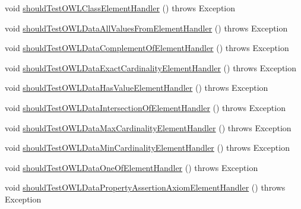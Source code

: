 \begin{DoxyCompactItemize}
\item 
void \hyperlink{classorg_1_1semanticweb_1_1owlapi_1_1contract_1_1_contract_owlxmlparser_test_a4edf0bd026bf1063202beddd96832b80}{should\-Test\-O\-W\-L\-Class\-Element\-Handler} ()  throws Exception 
\item 
void \hyperlink{classorg_1_1semanticweb_1_1owlapi_1_1contract_1_1_contract_owlxmlparser_test_a5c70c46244c22d593dad2a6539fba749}{should\-Test\-O\-W\-L\-Data\-All\-Values\-From\-Element\-Handler} ()  throws Exception 
\item 
void \hyperlink{classorg_1_1semanticweb_1_1owlapi_1_1contract_1_1_contract_owlxmlparser_test_a05fc1116c82f5390ffaf4afd5430eb15}{should\-Test\-O\-W\-L\-Data\-Complement\-Of\-Element\-Handler} ()  throws Exception 
\item 
void \hyperlink{classorg_1_1semanticweb_1_1owlapi_1_1contract_1_1_contract_owlxmlparser_test_aa977b2e7aad7087f13b2f962b78e002e}{should\-Test\-O\-W\-L\-Data\-Exact\-Cardinality\-Element\-Handler} ()  throws Exception 
\item 
void \hyperlink{classorg_1_1semanticweb_1_1owlapi_1_1contract_1_1_contract_owlxmlparser_test_a13c55f9fc07f454c5eb5289d89c14c61}{should\-Test\-O\-W\-L\-Data\-Has\-Value\-Element\-Handler} ()  throws Exception 
\item 
void \hyperlink{classorg_1_1semanticweb_1_1owlapi_1_1contract_1_1_contract_owlxmlparser_test_ad95ba5ba06770e5e12cfac6b4b26648f}{should\-Test\-O\-W\-L\-Data\-Intersection\-Of\-Element\-Handler} ()  throws Exception 
\item 
void \hyperlink{classorg_1_1semanticweb_1_1owlapi_1_1contract_1_1_contract_owlxmlparser_test_a20301adf7124f0134b6a9a2f3c74aef2}{should\-Test\-O\-W\-L\-Data\-Max\-Cardinality\-Element\-Handler} ()  throws Exception 
\item 
void \hyperlink{classorg_1_1semanticweb_1_1owlapi_1_1contract_1_1_contract_owlxmlparser_test_a3d9889e1d314ffb9e3b30a2c9a4933ed}{should\-Test\-O\-W\-L\-Data\-Min\-Cardinality\-Element\-Handler} ()  throws Exception 
\item 
void \hyperlink{classorg_1_1semanticweb_1_1owlapi_1_1contract_1_1_contract_owlxmlparser_test_a447d86bf15f7bde6a60049d74f8543c3}{should\-Test\-O\-W\-L\-Data\-One\-Of\-Element\-Handler} ()  throws Exception 
\item 
void \hyperlink{classorg_1_1semanticweb_1_1owlapi_1_1contract_1_1_contract_owlxmlparser_test_a211cb24e910aae95f2ed7341e30581f9}{should\-Test\-O\-W\-L\-Data\-Property\-Assertion\-Axiom\-Element\-Handler} ()  throws Exception 
\item 

\end{DoxyCompactItemize}
